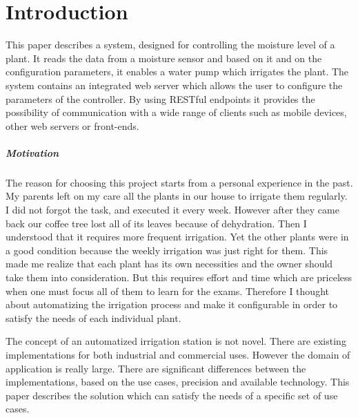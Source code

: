 \chapter{Introduction}

This paper describes a system, designed for controlling the moisture level of a plant. It reads the data from a moisture sensor and based on it and on the configuration parameters, it enables a water pump which irrigates the plant. The system contains an integrated web server which allows the user to configure the parameters of the controller. By using RESTful endpoints it provides the possibility of communication with a wide range of clients such as mobile devices, other web servers or front-ends.

\paragraph{Motivation} The reason for choosing this project starts from a personal experience in the past. My parents left on my care all the plants in our house to irrigate them regularly. I did not forgot the task, and executed it every week. However after they came back our coffee tree lost all of its leaves because of dehydration. Then I understood that it requires more frequent irrigation. Yet the other plants were in a good condition because the weekly irrigation was just right for them. This made me realize that each plant has its own necessities and the owner should take them into consideration. But this requires effort and time which are priceless when one must focus all of them to learn for the exams. Therefore I thought about automatizing the irrigation process and make it configurable in order to satisfy the needs of each individual plant.

\label{sec:not_new}
The concept of an automatized irrigation station is not novel. There are existing implementations for both industrial and commercial uses. However the domain of application is really large. There are significant differences between the implementations, based on the use cases, precision and available technology. This paper describes the solution which can satisfy the needs of a specific set of use cases.
